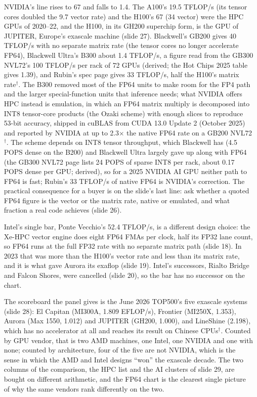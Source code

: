 \documentclass[11pt,letterpaper]{article}
\begin{document}
NVIDIA's line rises to 67 and falls to 1.4. The A100's 19.5 TFLOP/s (its tensor cores doubled the 9.7 vector rate) and the H100's 67 (34 vector) were the HPC GPUs of 2020--22, and the H100, in its GH200 superchip form, is the GPU of JUPITER, Europe's exascale machine (slide 27). Blackwell's GB200 gives 40 TFLOP/s with no separate matrix rate (the tensor cores no longer accelerate FP64), Blackwell Ultra's B300 about 1.4 TFLOP/s, a figure read from the GB300 NVL72's 100 TFLOP/s per rack of 72 GPUs (derived; the Hot Chips 2025 table gives 1.39), and Rubin's spec page gives 33 TFLOP/s, half the H100's matrix rate$^\dagger$. The B300 removed most of the FP64 units to make room for the FP4 path and the larger special-function units that inference needs; what NVIDIA offers HPC instead is emulation, in which an FP64 matrix multiply is decomposed into INT8 tensor-core products (the Ozaki scheme) with enough slices to reproduce 53-bit accuracy, shipped in cuBLAS from CUDA 13.0 Update 2 (October 2025) and reported by NVIDIA at up to 2.3$\times$ the native FP64 rate on a GB200 NVL72$^\dagger$. The scheme depends on INT8 tensor throughput, which Blackwell has (4.5 POPS dense on the B200) and Blackwell Ultra largely gave up along with FP64 (the GB300 NVL72 page lists 24 POPS of sparse INT8 per rack, about 0.17 POPS dense per GPU; derived), so for a 2025 NVIDIA AI GPU neither path to FP64 is fast; Rubin's 33 TFLOP/s of native FP64 is NVIDIA's correction. The practical consequence for a buyer is on the slide's last line: ask whether a quoted FP64 figure is the vector or the matrix rate, native or emulated, and what fraction a real code achieves (slide 26).

Intel's single bar, Ponte Vecchio's 52.4 TFLOP/s, is a different design choice: the Xe-HPC vector engine does eight FP64 FMAs per clock, half its FP32 lane count, so FP64 runs at the full FP32 rate with no separate matrix path (slide 18). In 2023 that was more than the H100's vector rate and less than its matrix rate, and it is what gave Aurora its exaflop (slide 19). Intel's successors, Rialto Bridge and Falcon Shores, were cancelled (slide 20), so the bar has no successor on the chart.

The scoreboard the panel gives is the June 2026 TOP500's five exascale systems (slide 28): El Capitan (MI300A, 1.809 EFLOP/s), Frontier (MI250X, 1.353), Aurora (Max 1550, 1.012) and JUPITER (GH200, 1.000), and LineShine (2.198), which has no accelerator at all and reaches its result on Chinese CPUs$^\dagger$. Counted by GPU vendor, that is two AMD machines, one Intel, one NVIDIA and one with none; counted by architecture, four of the five are not NVIDIA, which is the sense in which the AMD and Intel designs ``won'' the exascale decade. The two columns of the comparison, the HPC list and the AI clusters of slide 29, are bought on different arithmetic, and the FP64 chart is the clearest single picture of why the same vendors rank differently on the two.
\end{document}
